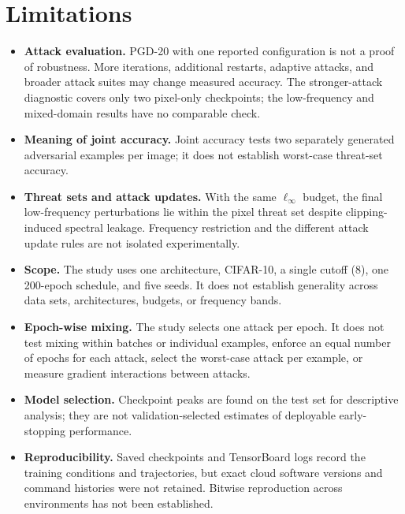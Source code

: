 \documentclass[11pt]{article}
\newcommand{\linf}{\ell_\infty}
\begin{document}
\section{Limitations}
\label{sec:limitations}
\begin{itemize}
  \item \textbf{Attack evaluation.} PGD-20 with one reported configuration is
  not a proof of robustness. More iterations, additional restarts, adaptive
  attacks, and broader attack suites may change measured accuracy. The
  stronger-attack diagnostic covers only two pixel-only checkpoints; the
  low-frequency and mixed-domain results have no comparable check.
  \item \textbf{Meaning of joint accuracy.} Joint accuracy tests two separately
  generated adversarial examples per image; it does not establish worst-case
  threat-set accuracy.
  \item \textbf{Threat sets and attack updates.} With the same $\linf$ budget, the
  final low-frequency perturbations lie within the pixel threat set despite
  clipping-induced spectral leakage. Frequency restriction and the different
  attack update rules are not isolated experimentally.
  \item \textbf{Scope.} The study uses one architecture, CIFAR-10, a single
  cutoff ($8$), one 200-epoch schedule, and five seeds. It does not establish
  generality across data sets, architectures, budgets, or frequency bands.
  \item \textbf{Epoch-wise mixing.} The study selects one attack per epoch.
  It does not test mixing within batches or individual examples, enforce an
  equal number of epochs for each attack, select the worst-case attack per
  example, or measure gradient interactions between attacks.
  \item \textbf{Model selection.} Checkpoint peaks are found on the test set
  for descriptive analysis; they are not validation-selected estimates of
  deployable early-stopping performance.
  \item \textbf{Reproducibility.} Saved checkpoints and TensorBoard logs
  record the training conditions and trajectories, but exact cloud software
  versions and command histories were not retained. Bitwise reproduction
  across environments has not been established.
\end{itemize}
\end{document}
